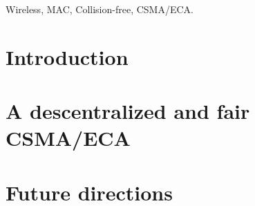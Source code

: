 \documentclass[conference]{IEEEtran}
\begin{document}
\begin{IEEEkeywords}
Wireless, MAC, Collision-free, CSMA/ECA.
\end{IEEEkeywords}

\section{Introduction} \label{introduction}
  

\section{A descentralized and fair CSMA/ECA} \label{csmae2ca}
  

\section{Future directions} \label{future}
  
  


  
\end{document}
